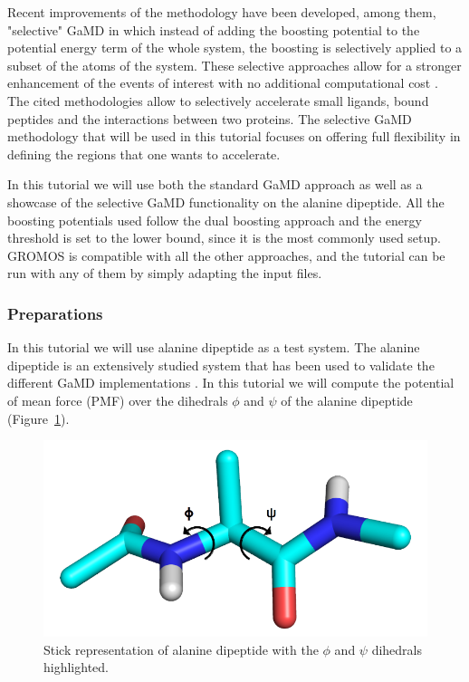 Recent improvements of the methodology have been developed, among them, "selective" GaMD in which instead of adding the boosting potential to the potential energy term of the whole system, the boosting is selectively applied to a subset of the atoms of the system. These selective approaches allow for a stronger enhancement of the events of interest with no additional computational cost \cite{miao2020ligand, wang2020peptide, wang2022protein, wang2023ligand}. The cited methodologies allow to selectively accelerate small ligands, bound peptides and the interactions between two proteins. The selective GaMD methodology that will be used in this tutorial focuses on offering full flexibility in defining the regions that one wants to accelerate.

In this tutorial we will use both the standard GaMD approach as well as a showcase of the selective GaMD functionality on the alanine dipeptide. All the boosting potentials used follow the dual boosting approach and the energy threshold is set to the lower bound, since it is the most commonly used setup. GROMOS is compatible with all the other approaches, and the tutorial can be run with any of them by simply adapting the input files.

\subsubsection{Preparations}
In this tutorial we will use alanine dipeptide as a test system. The alanine dipeptide is an extensively studied system that has been used to validate the different GaMD implementations \cite{pang2017gaussian, copeland2022gaussian, miao2015gaussian}. In this tutorial we will compute the potential of mean force (PMF) over the dihedrals $\phi$ and $\psi$ of the alanine dipeptide (Figure~\ref{aladip}).

\begin{figure}[H]
\centering
\includegraphics[scale=.3]{../07_tutorial_04/figures/aladip}
\caption{Stick representation of alanine dipeptide with the $\phi$ and $\psi$ dihedrals highlighted.}
\label{aladip}
\end{figure}
 

